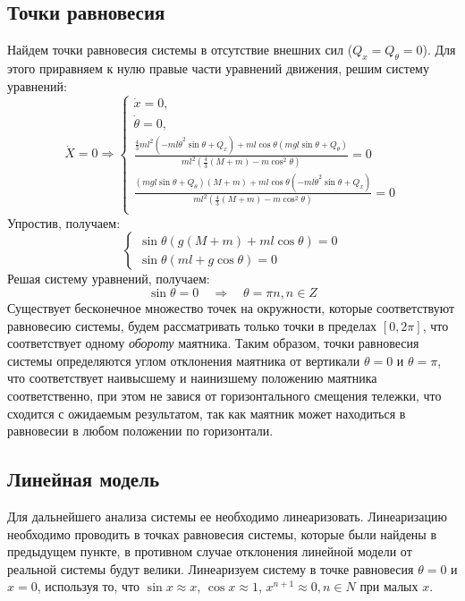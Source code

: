 \subsection{Точки равновесия}
Найдем точки равновесия системы в отсутствие внешних сил ($Q_x = Q_{\theta} = 0$). 
Для этого приравняем к нулю правые части уравнений движения, решим систему уравнений:
\begin{equation}
    \dot{X} = 0 \Rightarrow 
    \begin{cases}
        \dot{x} = 0, \\
        \dot{\theta} = 0, \\
        \frac{\frac{4}{3}ml^2(-ml\dot{\theta}^2\sin\theta + Q_x) + ml\cos\theta(mgl\sin\theta + Q_{\theta}) }{ml^2(\frac{4}{3}(M + m) - m\cos^2\theta)} = 0 \\
        \frac{(mgl\sin\theta + Q_{\theta})(M + m) + ml\cos\theta(-ml\dot{\theta}^2\sin\theta + Q_x) }{ml^2(\frac{4}{3}(M + m) - m\cos^2\theta)}  = 0 \\ 
    \end{cases}
\end{equation}
Упростив, получаем: 
\begin{equation}
    \begin{cases}
        \sin\theta(g(M + m) + ml\cos\theta) = 0 \\ 
        \sin\theta(ml + g\cos\theta) = 0
    \end{cases}
\end{equation}
Решая систему уравнений, получаем:
\begin{equation}
    \sin\theta = 0 \quad\Rightarrow\quad \theta = \pi n, n \in Z
\end{equation}
Существует бесконечное множество точек на окружности, которые соответствуют равновесию системы, будем рассматривать только 
точки в пределах $[0, 2\pi]$, что соответствует одному \textit{обороту} маятника.
Таким образом, точки равновесия системы определяются углом отклонения маятника от вертикали $\theta = 0$ и $\theta = \pi$, 
что соответствует наивысшему и наинизшему положению маятника соответственно, при этом не завися от горизонтального 
смещения тележки, что сходится с ожидаемым результатом, так как маятник может находиться в равновесии в любом положении по горизонтали. 

\subsection{Линейная модель}
Для дальнейшего анализа системы ее необходимо линеаризовать. Линеаризацию необходимо проводить в точках равновесия 
системы, которые были найдены в предыдущем пункте, в противном случае отклонения линейной модели от реальной системы будут велики. 
Линеаризуем систему в точке равновесия $\theta = 0$ и $x = 0$, используя то, что $\sin x \approx x$, $\cos x \approx 1$, $x^{n + 1} \approx 0, n \in N$ 
при малых $x$. 

